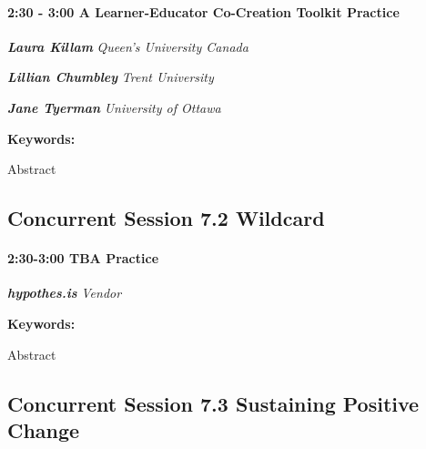 \documentclass[
]{book}
\begin{document}
\begin{session}
\hypertarget{a-learner-educator-co-creation-toolkit-practice}{%
\paragraph*{\texorpdfstring{2:30 - 3:00 \textbar{} \textbf{A
Learner-Educator Co-Creation Toolkit} \textbar{}
Practice}{2:30 - 3:00 \textbar{} A Learner-Educator Co-Creation Toolkit \textbar{} Practice}}\label{a-learner-educator-co-creation-toolkit-practice}}

\textbf{\emph{Laura Killam}} \textbar{} \emph{Queen's University Canada}

\textbf{\emph{Lillian Chumbley}} \textbar{} \emph{Trent University }

\textbf{\emph{Jane Tyerman}} \textbar{} \emph{University of Ottawa}

\textbf{Keywords:}

Abstract
\end{session}

\hypertarget{concurrent-session-7.2-wildcard}{%
\subsection*{Concurrent Session 7.2 \textbar{} Wildcard}\label{concurrent-session-7.2-wildcard}}

\begin{session}
\hypertarget{tba-practice}{%
\paragraph*{\texorpdfstring{2:30-3:00 \textbar{} \textbf{TBA} \textbar{}
Practice}{2:30-3:00 \textbar{} TBA \textbar{} Practice}}\label{tba-practice}}

\textbf{\emph{hypothes.is}} \textbar{} \emph{Vendor}

\textbf{Keywords:}

Abstract
\end{session}

\hypertarget{concurrent-session-7.3-sustaining-positive-change}{%
\subsection*{Concurrent Session 7.3 \textbar{} Sustaining Positive Change}\label{concurrent-session-7.3-sustaining-positive-change}}
\end{document}
